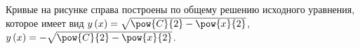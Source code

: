 \documentclass[a5paper,10pt]{article}
\begin{document}
\begin{figure}[!h]
\begin{minipage}{.5\textwidth}
\end{minipage}
\end{figure}

\begin{remark} 
    Кривые на рисунке справа построены по общему решению исходного 
    уравнения, которое имеет вид 
    $y\br{x} = \sqrt{\pow{C}{2} - \pow{x}{2}}$,
    $y\br{x} = -\sqrt{\pow{C}{2} - \pow{x}{2}}$.
\end{remark}
\end{document}
